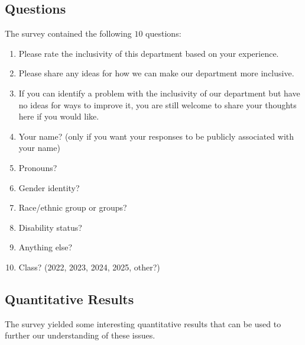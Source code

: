 \documentclass{article}
\begin{document}
\subsection{Questions}
The survey contained the following $10$ questions:
\begin{enumerate}
\item Please rate the inclusivity of this department based on your experience.	
\item Please share any ideas for how we can make our department more inclusive.	
\item If you can identify a problem with the inclusivity of our department but have no ideas for ways to improve it, you are still welcome to share your thoughts here if you would like.	
\item Your name? (only if you want your responses to be publicly associated with your name)	
\item Pronouns?	
\item Gender identity?	
\item Race/ethnic group or groups?	
\item Disability status?	
\item Anything else?	
\item Class? (2022, 2023, 2024, 2025, other?)
\end{enumerate}

\subsection{Quantitative Results}
The survey yielded some interesting quantitative results that can be 
used to further our understanding of these issues.
\end{document}
